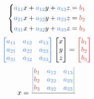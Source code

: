\begin{multicols}{2}
\begin{CheatsheetEntryFrame}
        \begin{equation*}
            \begin{dcases}
                \xmemphB{a_{11}} x + \xmemphB{a_{12}} y + \xmemphB{a_{13}} z = \xmemphR{b_1} \\
                \xmemphB{a_{21}} x + \xmemphB{a_{22}} y + \xmemphB{a_{23}} z = \xmemphR{b_2} \\
                \xmemphB{a_{31}} x + \xmemphB{a_{32}} y + \xmemphB{a_{33}} z = \xmemphR{b_3}
            \end{dcases}
        \end{equation*}
        \begin{equation*}
                \xmemphB{
                    \begin{bmatrix}
                        a_{11} & a_{12} & a_{13} \\
                        a_{21} & a_{22} & a_{23} \\
                        a_{31} & a_{32} & a_{33}
                    \end{bmatrix}
                }
                \begin{bmatrix}
                    x \\
                    y \\
                    z
                \end{bmatrix}
                =
                \xmemphR{
                    \begin{bmatrix}
                        b_1 \\
                        b_2 \\
                        b_3
                    \end{bmatrix}
                }
        \end{equation*}
        \begin{equation*}
                x
                    = \frac{
                        \xmemphB{
                            \begin{vmatrix}
                                \xmemphR{b_1} & a_{12} & a_{13} \\
                                \xmemphR{b_2} & a_{22} & a_{23} \\
                                \xmemphR{b_3} & a_{32} & a_{33}
                            \end{vmatrix}
                        }
                    }{
                        \xmemphB{
}}
\end{equation*}
\end{CheatsheetEntryFrame}
\end{multicols}
